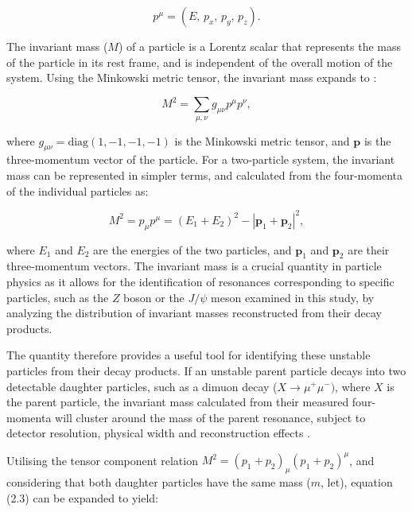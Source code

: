 \documentclass[11pt, a4paper]{article}
\numberwithin{equation}{section}
\begin{document}
\begin{equation} p^\mu = \left(E,\,p_x,\,p_y,\,p_z\right). \end{equation}

The invariant mass ($M$) of a particle is a Lorentz scalar that represents the mass of the particle in its rest frame, and is independent of the overall motion of the system. Using the Minkowski metric tensor, the invariant mass expands to \cite{griffiths1987elementaryparticles}:

\begin{equation} M^2 = \sum_{\mu,\nu} g_{\mu\nu} p^\mu p^\nu, \end{equation}

\begin{sloppypar}

where $g_{\mu\nu} = \text{diag} (1, -1, -1, -1)$ is the Minkowski metric tensor, and $\mathbf{p}$ is the three-momentum vector of the particle. For a two-particle system, the invariant mass can be represented in simpler terms, and calculated from the four-momenta of the individual particles as:

\end{sloppypar}

\begin{equation} M^2 = p_{\mu}p^{\mu} = (E_1 + E_2)^2 - |\mathbf{p}_1 + \mathbf{p}_2|^2, \end{equation}

where $E_1$ and $E_2$ are the energies of the two particles, and $\mathbf{p}_1$ and $\mathbf{p}_2$ are their three-momentum vectors. The invariant mass is a crucial quantity in particle physics as it allows for the identification of resonances corresponding to specific particles, such as the $Z$ boson or the $J/\psi$ meson examined in this study, by analyzing the distribution of invariant masses reconstructed from their decay products.

The quantity therefore provides a useful tool for identifying these unstable particles from their decay products. If an unstable parent particle decays into two detectable daughter particles, such as a dimuon decay ($X \to \mu^+ \mu^-)$, where $X$ is the parent particle, the invariant mass calculated from their measured four-momenta will cluster around the mass of the parent resonance, subject to detector resolution, physical width and reconstruction effects \cite{thomson2013modernparticle}.

Utilising the tensor component relation $M^2 = (p_1 + p_2)_\mu (p_1 + p_2)^\mu$, and considering that both daughter particles have the same mass ($m$, let), equation (2.3) can be expanded to yield:
\end{document}
